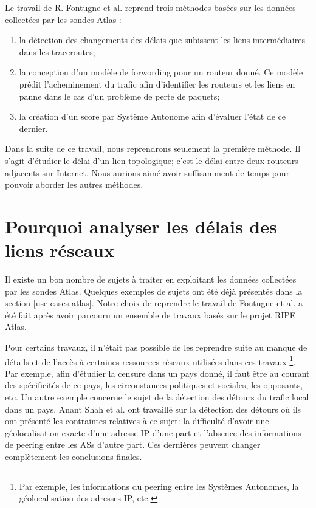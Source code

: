 Le travail de R. Fontugne et al. reprend trois méthodes basées sur les données collectées par les sondes Atlas :

\begin{enumerate}
	\item la détection des changements des délais que subissent les liens intermédiaires dans les traceroutes; 
	
	\item la conception d'un modèle de forwording pour un routeur donné. Ce modèle  prédit l'acheminement du trafic afin d'identifier les routeurs  et les liens en panne dans le cas  d'un problème  de perte de paquets;
	
	\item la création d'un score par Système Autonome afin d'évaluer l'état de ce dernier.
	
\end{enumerate}

Dans la suite de ce travail, nous  reprendrons seulement la première méthode.  Il s'agit d'étudier le délai d'un lien topologique; c'est le délai entre deux routeurs adjacents sur Internet. Nous aurions aimé avoir suffisamment de temps pour pouvoir aborder les autres méthodes.  



\section{Pourquoi analyser les délais des liens réseaux}

Il existe un bon nombre de sujets à traiter en exploitant les données collectées par les sondes Atlas. Quelques exemples de sujets ont été déjà présentés dans la section \ref{use-cases-atlas}. Notre choix de reprendre le travail de Fontugne et al. a été fait après avoir parcouru un ensemble de travaux basés sur le projet  RIPE Atlas. 

Pour certains travaux, il n'était pas possible  de les reprendre suite au manque de détails et de l'accès à  certaines ressources réseaux utilisées dans ces travaux \footnote{Par exemple, les informations du peering entre les Systèmes Autonomes, la géolocalisation des adresses IP, etc.}. Par exemple, afin d'étudier la censure dans un pays donné, il faut être au courant des spécificités de ce pays, les circonstances politiques et sociales, les opposants,  etc.  Un autre exemple concerne le sujet de la détection des détours du trafic local dans un pays.  Anant Shah  et al. ont travaillé sur la détection des détours \cite{anant-shah} où ils ont présenté  les contraintes relatives à ce sujet: la difficulté d'avoir une géolocalisation exacte d'une adresse IP d'une part et l'absence des informations de peering entre les ASs d'autre part. Ces dernières peuvent changer complètement les conclusions finales. 

